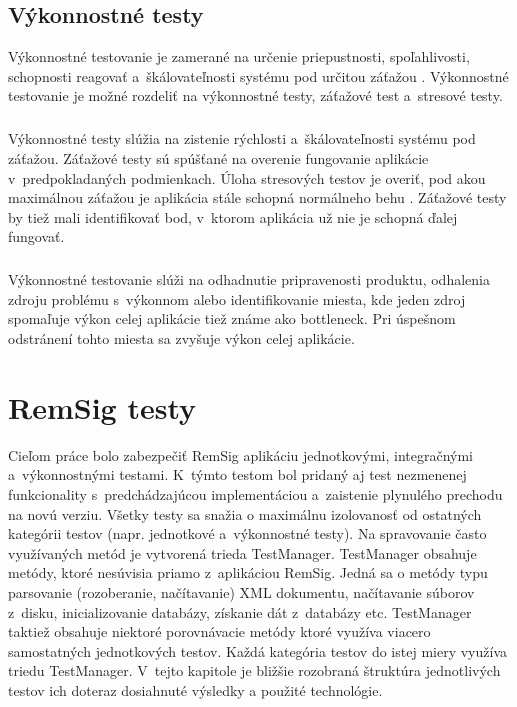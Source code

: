 \documentclass[
  digital, %
  table,   %
oneside,
  nolof,     %
  nolot,     %
]{fithesis3}
\begin{document}
\section{Výkonnostné testy}
Výkonnostné testovanie je zamerané na určenie priepustnosti, spoľahlivosti, schopnosti reagovať a~škálovateľnosti systému pod určitou záťažou \cite{ssl3.0}\cite{perfromanceTest}. Výkonnostné testovanie je možné rozdeliť na výkonnostné testy, záťažové test a~stresové testy.\paragraph{}
Výkonnostné testy slúžia na zistenie rýchlosti a~škálovateľnosti systému pod záťažou. Záťažové testy sú spúšťané na overenie fungovanie aplikácie v~predpokladaných podmienkach. Úloha stresových  testov je overiť, pod akou maximálnou záťažou je aplikácia stále schopná normálneho behu \cite{effectiveSoftwareTesting}. Záťažové testy by tiež mali identifikovať bod, v~ktorom aplikácia už nie je schopná ďalej fungovať.\paragraph{}
Výkonnostné testovanie slúži na odhadnutie pripravenosti produktu, odhalenia zdroju problému s~výkonnom alebo  identifikovanie miesta, kde jeden zdroj spomaľuje výkon celej aplikácie tiež známe ako bottleneck. Pri úspešnom odstránení tohto miesta sa zvyšuje výkon celej aplikácie.
\chapter{RemSig testy}
Cieľom práce bolo zabezpečiť  RemSig aplikáciu jednotkovými, integračnými a~výkonnostnými testami. K~týmto testom bol pridaný aj test nezmenenej funkcionality s~predchádzajúcou implementáciou a~zaistenie plynulého prechodu na novú verziu. Všetky  testy sa snažia o maximálnu izolovanosť od ostatných kategórii  testov (napr. jednotkové a~výkonnostné testy). Na spravovanie často využívaných metód je vytvorená trieda TestManager. TestManager obsahuje metódy, ktoré nesúvisia priamo z~aplikáciou RemSig. Jedná sa o metódy typu parsovanie (rozoberanie, načítavanie) XML dokumentu, načítavanie súborov z~disku, inicializovanie databázy, získanie dát z~databázy etc. TestManager taktiež obsahuje niektoré porovnávacie metódy ktoré využíva viacero samostatných jednotkových testov. Každá kategória testov do istej miery využíva triedu TestManager. V~tejto kapitole je bližšie rozobraná štruktúra jednotlivých testov ich doteraz dosiahnuté výsledky a použité technológie.
\end{document}
